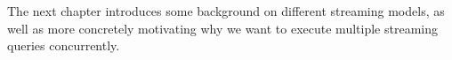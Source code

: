 The next chapter introduces some background on different streaming models, as well as more concretely motivating why we want to execute multiple streaming queries concurrently.



